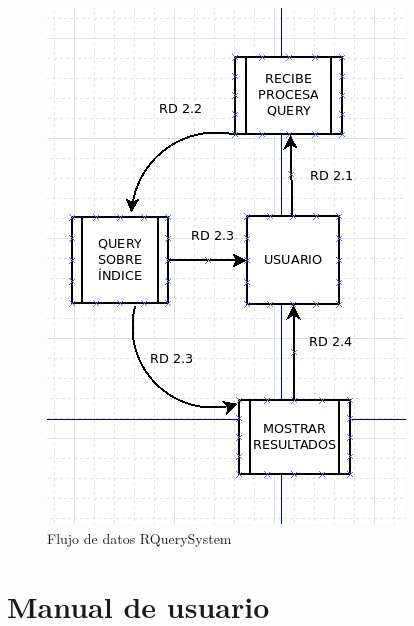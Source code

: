 \begin{figure}[H] %
	\centering
	\includegraphics[scale=0.5]{r-fd.png}  %
	\caption{Flujo de datos RQuerySystem} 
\end{figure}

\newpage
\section{Manual de usuario}

